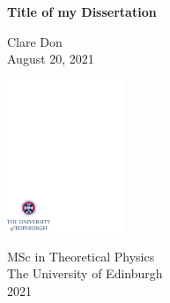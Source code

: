 \documentclass[12pt,a4paper]{report}
\begin{document}
\thispagestyle{empty}

%

\parindent=0pt          %
\parskip=5pt            %


\vspace*{0.1\textheight}

\begin{center}
        \huge{\bfseries Title of my Dissertation}\\
\end{center}

\bigskip

\begin{center}
        \large{Clare Don}\\  %
        \bigskip
        \large{August 20, 2021}  %
\end{center}


\vspace*{0.4\textheight}

\begin{center}
        \includegraphics[width=35mm]{crest.pdf}
\end{center}

\medskip

\begin{center}

\large{
  MSc in Theoretical Physics\\[0.8ex]
  The University of Edinburgh\\[0.8ex]
  2021
}

\end{center}
\end{document}
